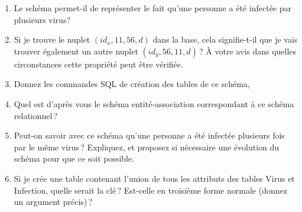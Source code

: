 \begin{enumerate}
 \item Le schéma permet-il de représenter le fait qu'une personne a été infectée par plusieurs virus?

 \item Si je trouve le nuplet $(id_x, 11, 56, d)$ dans la base, cela signifie-t-il 
    que je vais trouver également un autre nuplet $(id_y, 56, 11, d)$\,? À votre avis
    dans quelles circonstances cette propriété peut être vérifiée.
  
 \item Donnez les commandes SQL de création des tables de ce schéma, 

  \item Quel est d'après vous le schéma entité-association 
        correspondant à ce schéma relationnel\,?
        
   \item Peut-on savoir avec ce schéma qu'une personne a été infectée plusieurs
      fois par le même virus\,? Expliquez, et proposez si nécessaire 
      une évolution du schéma pour que ce soit possible.

    \item Si je crée une table contenant l'union de tous les attributs des tables Virus et Infection,
        quelle serait la clé\,? Est-celle en troisième forme normale (donnez un argument précis)\,?  
\end{enumerate}

